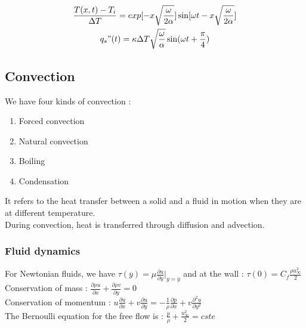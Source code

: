 \documentclass[../main.tex]{subfiles}
\begin{document}
\begin{equation}
    \begin{gathered}
        \frac{T(x,t) - T_i}{\Delta T} = exp[-x \sqrt{\frac{\omega}{2\alpha}}] \sin[\omega t - x\sqrt{\frac{\omega}{2\alpha}}]\\
        q_s"(t) = \kappa \Delta T \sqrt{\frac{\omega}{\alpha}} \sin(\omega t + \frac{\pi}{4})\\
    \end{gathered}
\end{equation}

\subsection{Convection}
We have four kinds of convection : \begin{enumerate}
    \item Forced convection\\
    \item Natural convection\\
    \item Boiling \\
    \item Condensation\\
\end{enumerate}

It refers to the heat transfer between a solid and a fluid in motion when they are at different temperature.\\
During convection, heat is transferred through diffusion and advection.\\

\subsubsection{Fluid dynamics}
For Newtonian fluids, we have $\tau(\overline{y}) = \mu \frac{\partial u}{\partial y}\lvert_{y=\overline{y}}$ and at the wall : $\tau(0) = C_f \frac{\rho u_\infty^2}{2}$\\

Conservation of mass : $\frac{\partial \rho u}{\partial x} + \frac{\partial \rho v}{\partial y} = 0$\\

Conservation of momentum : $u \frac{\partial u}{\partial x} + v \frac{\partial u}{\partial y} = -\frac{1}{\rho} \frac{\partial p}{\partial x} + v\frac{\partial^2 u}{\partial y^2}$\\

The Bernoulli equation for the free flow is : $\frac{p}{\rho} + \frac{u_\infty^2}{2} = cste$\\
\end{document}
